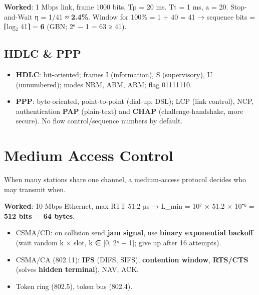 \endgroup

\textbf{Worked}: 1 Mbps link, frame 1000 bits, Tp = 20 ms. Tt = 1 ms, a = 20.
Stop-and-Wait η = 1/41 ≈ \textbf{2.4\%}. Window for 100\% = 1 + 40 = 41 → sequence bits = ⌈log₂ 41⌉ = \textbf{6} (GBN; 2⁶ − 1 = 63 ≥ 41).

\needspace{95pt}

\hypertarget{p2-09--64-hdlc--ppp}{%
\subsection{HDLC \& PPP}\label{p2-09--64-hdlc--ppp}}

\begin{itemize}
\tightlist
\item
  \textbf{HDLC}: bit-oriented; frames I (information), S (supervisory), U (unnumbered); modes NRM, ABM, ARM; flag 01111110.
\item
  \textbf{PPP}: byte-oriented, point-to-point (dial-up, DSL); LCP (link control), NCP, authentication \textbf{PAP} (plain-text) and \textbf{CHAP} (challenge-handshake, more secure). No flow control/sequence numbers by default.
\end{itemize}

\needspace{125pt}

\hypertarget{p2-09--7-medium-access-control}{%
\section{Medium Access Control}\label{p2-09--7-medium-access-control}}

When many stations share one channel, a medium-access protocol decides who may transmit when.





\textbf{Worked}: 10 Mbps Ethernet, max RTT 51.2 µs → L\_min = 10⁷ × 51.2 × 10⁻⁶ = \textbf{512 bits = 64 bytes}.

\begin{itemize}
\tightlist
\item
  CSMA/CD: on collision send \textbf{jam signal}, use \textbf{binary exponential backoff} (wait random k × slot, k ∈ {[}0, 2ⁿ − 1{]}; give up after 16 attempts).
\item
  CSMA/CA (802.11): \textbf{IFS} (DIFS, SIFS), \textbf{contention window}, \textbf{RTS/CTS} (solves \textbf{hidden terminal}), NAV, ACK.
\item
  Token ring (802.5), token bus (802.4).
\end{itemize}

